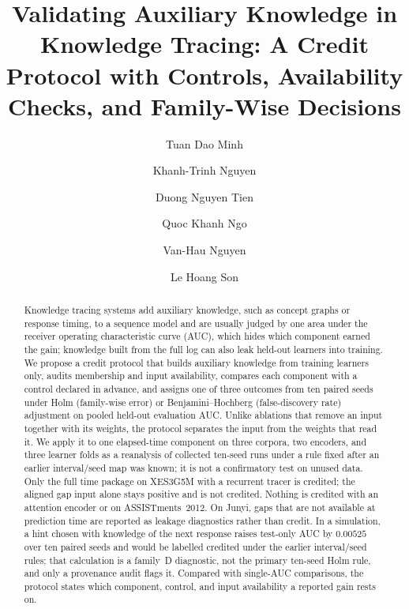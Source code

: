 \documentclass[review,12pt]{elsarticle}
\begin{document}
\begin{frontmatter}

\title{Validating Auxiliary Knowledge in Knowledge Tracing: A Credit
Protocol with Controls, Availability Checks, and Family-Wise
Decisions}

\author[utehy]{Tuan Dao Minh}
\author[utehy]{Khanh-Trinh Nguyen}
\author[utehy]{Duong Nguyen Tien}
\author[vnu]{Quoc Khanh Ngo}
\author[utehy]{Van-Hau Nguyen}
\author[vnu]{Le Hoang Son}



\begin{abstract}
Knowledge tracing systems add auxiliary knowledge, such as concept
graphs or response timing, to a sequence model and are usually judged
by one area under the receiver operating characteristic curve (AUC),
which hides which component earned the gain; knowledge built from the
full log can also leak held-out learners into training. We propose a
credit protocol that builds auxiliary knowledge from training learners
only, audits membership and input availability, compares each component
with a control declared in advance, and assigns one of three outcomes
from ten paired seeds under Holm (family-wise error) or
Benjamini--Hochberg (false-discovery rate) adjustment on pooled
held-out evaluation AUC.
Unlike ablations that remove an input together with its weights, the
protocol separates the input from the weights that read it. We apply it
to one elapsed-time component on three corpora, two encoders, and three
learner folds as a reanalysis of collected ten-seed runs under a rule
fixed after an earlier interval/seed map was known; it is not a
confirmatory test on unused data. Only the full time package on XES3G5M
with a recurrent tracer is credited; the aligned gap input alone stays
positive and is not credited. Nothing is credited with an attention
encoder or on ASSISTments~2012. On Junyi, gaps that are not available at
prediction time are reported as leakage diagnostics rather than credit.
In a simulation, a hint chosen with knowledge of the next response
raises test-only AUC by $0.00525$ over ten paired seeds and would be
labelled credited under the earlier interval/seed rules; that
calculation is a family~D diagnostic, not the primary ten-seed Holm
rule, and only a provenance audit flags it. Compared with single-AUC comparisons, the protocol
states which component, control, and input availability a reported gain
rests on.
\end{abstract}


\end{frontmatter}
\end{document}
